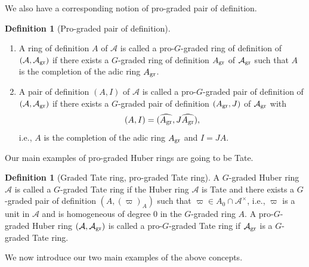 \documentclass[12pt,twoside,a4paper]{article}
\theoremstyle{definition}
\newtheorem{mydef}[thm]{Definition}
\theoremstyle{remark}
\newcommand\gr{{\rm gr}}
\begin{document}
We also have a corresponding notion of pro-graded pair of definition.
\begin{mydef}[Pro-graded pair of definition]\label{Pro-graded pair of definition}\begin{enumerate}[(1)]Let $(\mathcal{A}, \mathcal{A}_{\gr})$ be a pro-$G$-graded Huber ring. \item A ring of definition $A$ of $\mathcal{A}$ is called a pro-$G$-graded ring of definition of $(\mathcal{A}, \mathcal{A}_{\gr})$ if there exists a $G$-graded ring of definition $A_{\gr}$ of $\mathcal{A}_{\gr}$ such that $A$ is the completion of the adic ring $A_{\gr}$. \item A pair of definition $(A, I)$ of $\mathcal{A}$ is called a pro-$G$-graded pair of definition of $(\mathcal{A}, \mathcal{A}_{\gr})$ if there exists a $G$-graded pair of definition $(A_{\gr}, J)$ of $\mathcal{A}_{\gr}$ with \begin{equation*}(A, I)=(\widehat{A_{\gr}}, J\widehat{A_{\gr}}),\end{equation*}i.e., $A$ is the completion of the adic ring $A_{\gr}$ and $I=JA$.\end{enumerate}\end{mydef} 
Our main examples of pro-graded Huber rings are going to be Tate.
\begin{mydef}[Graded Tate ring, pro-graded Tate ring]A $G$-graded Huber ring $\mathcal{A}$ is called a $G$-graded Tate ring if the Huber ring $\mathcal{A}$ is Tate and there exists a $G$-graded pair of definition $(A, (\varpi)_{A})$ such that $\varpi\in A_{0}\cap \mathcal{A}^{\times}$, i.e., $\varpi$ is a unit in $\mathcal{A}$ and is homogeneous of degree $0$ in the $G$-graded ring $A$. A pro-$G$-graded Huber ring $(\mathcal{A}, \mathcal{A}_{\gr})$ is called a pro-$G$-graded Tate ring if $\mathcal{A}_{\gr}$ is a $G$-graded Tate ring.\end{mydef}
We now introduce our two main examples of the above concepts.  
\end{document}
